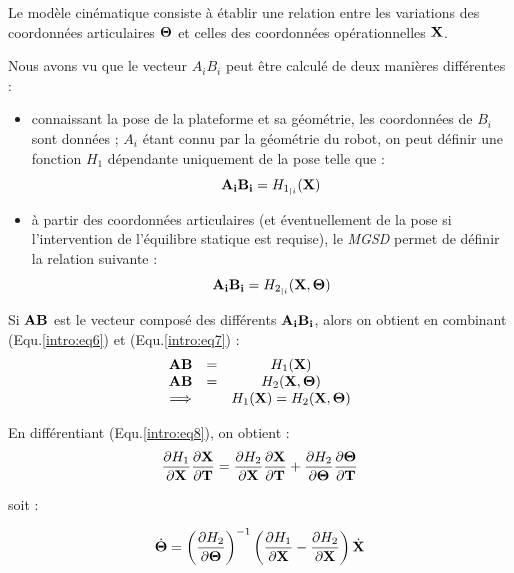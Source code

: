Le modèle cinématique consiste à établir une relation entre les variations des coordonnées articulaires ${\bf \Theta}$ et celles des coordonnées opérationnelles ${\bf X}$.

Nous avons vu que le vecteur $A_iB_i$ peut être calculé de deux manières différentes :
\begin{itemize}
 \item connaissant la pose de la plateforme et sa géométrie, les coordonnées de $B_i$ sont données ; $A_i$ étant connu par la géométrie du robot, on peut définir une fonction $H_1$ dépendante uniquement de la pose telle que :
\begin{equation}
{\bf A_iB_i} = H_{1_{|i}}({\bf X})
\label{intro:eq6}
\end{equation}
 \item à partir des coordonnées articulaires (et éventuellement de la pose si l'intervention de l'équilibre statique est requise), le {\it MGSD} permet de définir la relation suivante :
\begin{equation}
{\bf A_iB_i} = H_{2_{|i}}({\bf X}, {\bf \Theta})
\label{intro:eq7}
\end{equation}
\end{itemize}
 
Si ${\bf AB}$ est le vecteur composé des différents ${\bf A_iB_i}$, alors on obtient en combinant (Equ.\ref{intro:eq6}) et (Equ.\ref{intro:eq7}) :
\begin{equation}
\begin{matrix}
{\bf AB} &=& H_1({\bf X}) \\
{\bf AB} &=& H_2({\bf X}, {\bf \Theta}) \\
\Longrightarrow & & H_1({\bf X}) = H_2({\bf X}, {\bf \Theta})
\end{matrix}
\label{intro:eq8}
\end{equation}

En différentiant (Equ.\ref{intro:eq8}), on obtient :
\begin{equation}
\frac{\partial H_1}{\partial {\bf X}} \frac{\partial {\bf X}}{\partial {\bf T}} =  \frac{\partial H_2}{\partial {\bf X}} \frac{\partial {\bf X}}{\partial {\bf T}} + \frac{\partial H_2}{\partial {\bf \Theta}} \frac{\partial {\bf \Theta}}{\partial {\bf T}}
\label{intro:eq9}
\end{equation}

soit :

\begin{equation}
\dot {\bf \Theta} = \left ( \frac{\partial H_2}{\partial {\bf \Theta}} \right )^{-1} \left (\frac{\partial H_1}{\partial {\bf X}} - \frac{\partial H_2}{\partial {\bf X}} \right ) \dot {\bf X}
\label{intro:eq10}
\end{equation}


